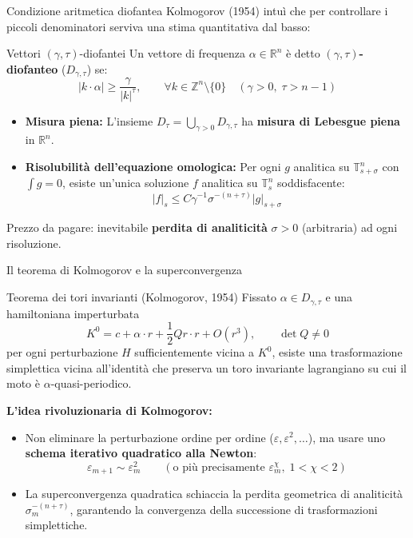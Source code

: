 \documentclass[10pt,aspectratio=169]{beamer}
\newcommand{\T}{\mathbb{T}}
\newcommand{\R}{\mathbb{R}}
\newcommand{\Z}{\mathbb{Z}}
\newcommand{\eps}{\varepsilon}
\newcommand{\blu}[1]{\textcolor{UniBlue}{\textbf{#1}}}
\begin{document}
\begin{frame}{Condizione aritmetica diofantea}
  Kolmogorov (1954) intuì che per controllare i piccoli denominatori serviva una stima quantitativa dal basso:
  \begin{block}{Vettori $(\gamma, \tau)$-diofantei}
    Un vettore di frequenza $\alpha \in \R^n$ è detto \blu{$(\gamma, \tau)$-diofanteo} ($D_{\gamma, \tau}$) se:
    \[
      |k \cdot \alpha| \ge \frac{\gamma}{|k|^\tau}, \qquad \forall k \in \Z^n \setminus \{0\} \quad (\gamma > 0, \; \tau > n - 1)
    \]
  \end{block}
  \pause
  \begin{itemize}
    \item \blu{Misura piena:} L'insieme $D_\tau = \bigcup_{\gamma > 0} D_{\gamma, \tau}$ ha \textbf{misura di Lebesgue piena} in $\R^n$.
    \item \blu{Risolubilità dell'equazione omologica:} Per ogni $g$ analitica su $\T^n_{s+\sigma}$ con $\int g = 0$, esiste un'unica soluzione $f$ analitica su $\T^n_s$ soddisfacente:
    \[
      |f|_s \le C \gamma^{-1} \sigma^{-(n+\tau)} |g|_{s+\sigma}
    \]
  \end{itemize}
  \alert{Prezzo da pagare:} inevitabile \textbf{perdita di analiticità} $\sigma > 0$ (arbitraria) ad ogni risoluzione.
\end{frame}

\begin{frame}{Il teorema di Kolmogorov e la superconvergenza}
  \begin{block}{Teorema dei tori invarianti (Kolmogorov, 1954)}
    Fissato $\alpha \in D_{\gamma, \tau}$ e una hamiltoniana imperturbata
    \[
      K^0 = c + \alpha \cdot r + \frac{1}{2}Qr \cdot r + O(r^3), \qquad \det Q \neq 0
    \]
    per ogni perturbazione $H$ sufficientemente vicina a $K^0$, esiste una trasformazione simplettica vicina all'identità che preserva un toro invariante lagrangiano su cui il moto è $\alpha$-quasi-periodico.
  \end{block}
  \pause
  \blu{L'idea rivoluzionaria di Kolmogorov:}
  \begin{itemize}
    \item Non eliminare la perturbazione ordine per ordine ($\eps, \eps^2, \dots$), ma usare uno \textbf{schema iterativo quadratico alla Newton}:
    \[
      \eps_{m+1} \sim \eps_m^2 \qquad (\text{o più precisamente } \eps_m^{\chi}, \; 1 < \chi < 2)
    \]
    \item La \alert{superconvergenza} quadratica schiaccia la perdita geometrica di analiticità $\sigma_m^{-(n+\tau)}$, garantendo la convergenza della successione di trasformazioni simplettiche.
  \end{itemize}
\end{frame}
\end{document}

